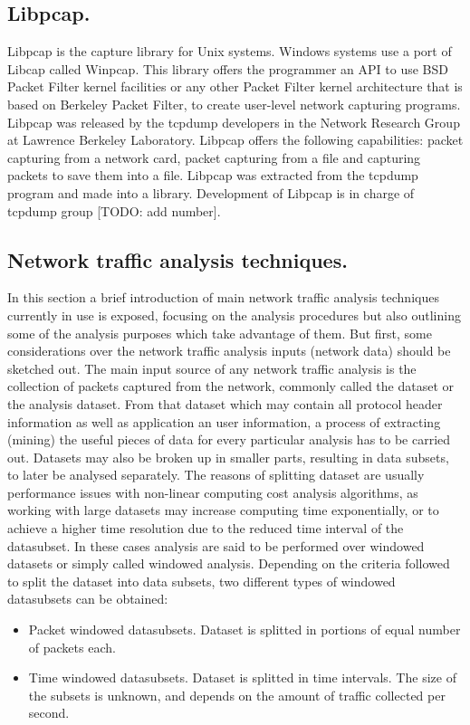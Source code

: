 \documentclass[thesis=M,english]{FITthesis}[2011/07/15]
\begin{document}
\subsection{Libpcap.}
Libpcap is the capture library for Unix systems. Windows systems use a port of Libcap called Winpcap. This library offers the programmer an API to use BSD Packet Filter kernel facilities or any other Packet Filter kernel architecture that is based on Berkeley Packet Filter, to create user-level network capturing programs. Libpcap was released by the tcpdump developers in the Network Research Group at Lawrence Berkeley Laboratory. Libpcap offers the following capabilities: packet capturing from a network card, packet capturing from a file and capturing packets to save them into a file. Libpcap was extracted from the tcpdump program and made into a library. Development of Libpcap is in charge of tcpdump group [TODO: add number].

\subsection{Network traffic analysis techniques.}
In this section a brief introduction of main network traffic analysis techniques currently in use is exposed, focusing on the analysis procedures but also outlining some of the
analysis purposes which take advantage of them. But first, some considerations over the network traffic analysis inputs (network data) should be sketched out. The main input source of any network traffic analysis is the collection of packets captured from the network, commonly called the dataset or the analysis dataset. From that dataset which may contain all protocol header information as well as application an user information, a process of extracting (mining) the useful pieces of data for every particular analysis has to be carried out.
Datasets may also be broken up in smaller parts, resulting in data subsets, to later be analysed separately. The reasons of splitting dataset are usually performance issues with non-linear computing cost analysis algorithms, as working with large datasets may increase computing time exponentially, or to achieve a higher time resolution due to the reduced time interval of the datasubset. In these cases analysis are said to be performed over windowed datasets or simply called windowed analysis. Depending on the criteria followed to split the dataset into data subsets, two different types of windowed datasubsets can be obtained:
\begin{itemize}
\item Packet windowed datasubsets. Dataset is splitted in portions of equal number of packets each.
\item Time windowed datasubsets. Dataset is splitted in time intervals. The size of the subsets is unknown, and depends on the amount of traffic collected per second.
\end{itemize}
\end{document}
